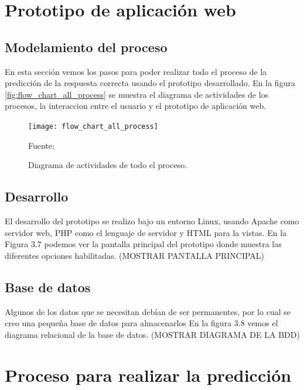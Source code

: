 \section{Prototipo de aplicación web} 

\subsection{Modelamiento del proceso}

En esta sección vemos los pasos para poder realizar todo el proceso de la predicción de la respuesta correcta usando el prototipo desarrollado. En la figura \ref{fig:flow_chart_all_process} se muestra el diagrama de actividades de los procesos, la interaccion entre el usuario y el prototipo de aplicación web.

\begin{figure}[ht]
	\begin{center}
		\texttt{[image: flow\_chart\_all\_process]}
	\end{center}
	\begin{center}
		\vskip -0.5cm
		\caption{\small{Diagrama de actividades de todo el proceso.}}
		{\small{Fuente: }}
	\end{center}
\end{figure}


\subsection{Desarrollo}

El desarrollo del prototipo se realizo bajo un entorno Linux, usando Apache como servidor web, PHP como el lenguaje de servidor y HTML para la vistas. En la Figura 3.7 podemos ver la pantalla principal del prototipo donde muestra las diferentes opciones habilitadas. (MOSTRAR PANTALLA PRINCIPAL)

\subsection{Base de datos}
Algunos de los datos que se necesitan debían de ser permanentes, por lo cual se creo una pequeña base de datos para almacenarlos En la figura 3.8 vemos el diagrama relacional de la base de datos. (MOSTRAR DIAGRAMA DE LA BDD)


\section{Proceso para realizar la predicción} 

